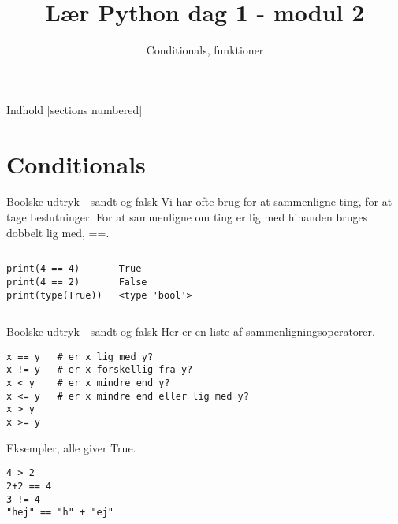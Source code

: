 \documentclass[main.tex]{subfiles}
\title{Lær Python dag 1 - modul 2}
\subtitle{Conditionals, funktioner}
\begin{document}
\maketitle

\begin{frame}{Indhold}
  [sections numbered]
  \tableofcontents[hideallsubsections]
\end{frame}



\section{Conditionals}
\begin{frame}[fragile]{Boolske udtryk - sandt og falsk}
	Vi har ofte brug for at sammenligne ting, for at tage beslutninger. For at sammenligne om ting er lig med hinanden bruges dobbelt lig med, ==. 

\begin{columns}
	\begin{lstlisting}[style=python]
print(4 == 4)
print(4 == 2)
print(type(True))
	\end{lstlisting}
\pause
	\begin{lstlisting}[style=python]
True
False
<type 'bool'>
	\end{lstlisting}

\end{columns}

\end{frame}

\begin{frame}[fragile]{Boolske udtryk - sandt og falsk}
Her er en liste af sammenligningsoperatorer.
\begin{lstlisting}[style=python]
x == y   # er x lig med y?
x != y   # er x forskellig fra y?
x < y    # er x mindre end y?
x <= y   # er x mindre end eller lig med y?
x > y
x >= y
\end{lstlisting}

Eksempler, alle giver True.
\begin{lstlisting}[style=python]
4 > 2
2+2 == 4
3 != 4
"hej" == "h" + "ej"
\end{lstlisting}
\end{frame}
\end{document}
